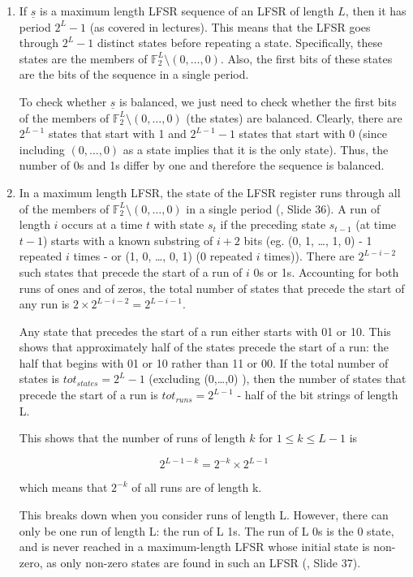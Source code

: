\begin{enumerate}

\item If $\underline{s}$ is a maximum length LFSR sequence of an LFSR of length
$L$, then it has period $2^L-1$ (as covered in lectures). This means that the
LFSR goes through $2^L-1$ distinct states before repeating a state.
Specifically, these states are the members of $\mathbb{F}_2^L \setminus
{(0,\dots,0)}$. Also, the first bits of these states are the bits of the
sequence in a single period.

To check whether $\underline{s}$ is balanced, we just need to check whether the
first bits of the members of $\mathbb{F}_2^L \setminus {(0,\dots,0)}$ (the
states) are balanced. Clearly, there are $2^{L-1}$ states that start with 1 and
$2^{L-1}-1$ states that start with 0 (since including $(0,\dots,0)$ as a state
implies that it is the only state). Thus, the number of 0s and 1s differ by one
and therefore the sequence is balanced.

\item In a maximum length LFSR, the state of the LFSR register runs through all
of the members of $\mathbb{F}_2^L \setminus {(0,\dots,0)}$ in a single period
(\cite{slides}, Slide 36). A run of length $i$ occurs at a time $t$ with state
$s_t$ if the preceding state $s_{t-1}$ (at time $t-1$) starts with a known
substring of $i+2$ bits (eg. (0, 1, \dots, 1, 0) - 1 repeated $i$ times - or (1,
0, \dots, 0, 1) (0 repeated $i$ times)). There are $2^{L-i-2}$ such states that
precede the start of a run of $i$ 0s or 1s. Accounting for both runs of ones and
of zeros, the total number of states that precede the start of any run is $2
\times 2^{L-i-2} = 2^{L-i-1}$.

Any state that precedes the start of a run either starts with 01 or 10. This
shows that approximately half of the states precede the start of a run: the half
that begins with 01 or 10 rather than 11 or 00. If the total number of states is
$tot_{states} = 2^L-1$ (excluding (0,\dots,0) ), then the number of states that
precede the start of a run is $tot_{runs} = 2^{L-1}$ - half of the bit strings
of length L.

This shows that the number of runs of length $k$ for $1 \le k \le L-1$ is

\[2^{L-1-k} = 2^{-k} \times 2^{L-1}\]

which means that $2^{-k}$ of all runs are of length k.

This breaks down when you consider runs of length L. However, there can only be
one run of length L: the run of L 1s. The run of L 0s is the 0 state, and is
never reached in a maximum-length LFSR whose initial state is non-zero, as only
non-zero states are found in such an LFSR (\cite{slides}, Slide 37).

\end{enumerate}
